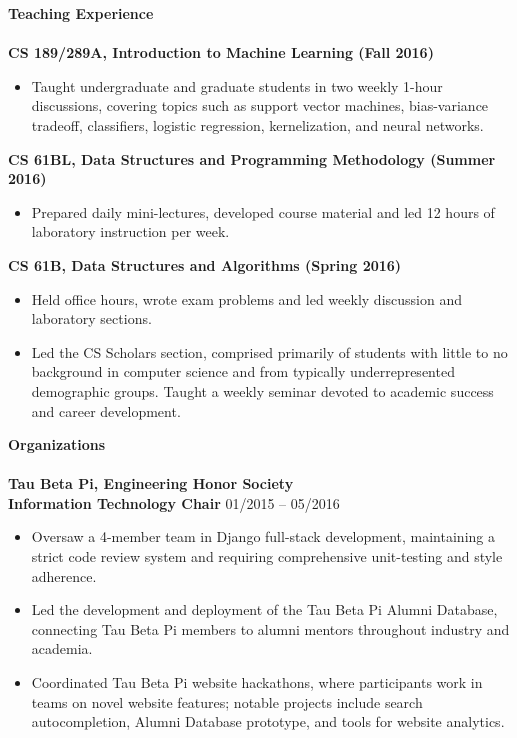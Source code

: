 \documentclass{article}
\begin{document}
\noindent
\textbf{{\Large Teaching Experience}}\\[-2mm]
\HRule\\
\textbf{CS 189/289A, Introduction to Machine Learning (Fall 2016)}
\begin{itemize}
\vspace{-2.5mm}
\item Taught undergraduate and graduate students in two weekly 1-hour discussions, covering topics such as support vector machines, bias-variance tradeoff, classifiers, logistic regression, kernelization, and neural networks.
\end{itemize}
\vspace{-2mm}
\textbf{CS 61BL, Data Structures and Programming Methodology (Summer 2016)}
\begin{itemize}
\vspace{-2.5mm}
\item Prepared daily mini-lectures, developed course material and led 12 hours of laboratory instruction per week.
\end{itemize}
\vspace{-2mm}
\textbf{CS 61B, Data Structures and Algorithms (Spring 2016)}
\begin{itemize}
\vspace{-2.5mm}
\item Held office hours, wrote exam problems and led weekly discussion and laboratory sections.
\vspace{-2.5mm}
\item Led the CS Scholars section, comprised primarily of students with little to no background in computer science and from typically underrepresented demographic groups. Taught a weekly seminar devoted to academic success and career development.
\end{itemize}
\newpage

\noindent
\textbf{{\Large Organizations}}\\[-2mm]
\HRule\\
\textbf{Tau Beta Pi, Engineering Honor Society} \\
\textbf{Information Technology Chair}
\hfill 01/2015 -- 05/2016
\begin{itemize}
\vspace{-2.5mm}
\item Oversaw a 4-member team in Django full-stack development, maintaining a strict code review system and requiring comprehensive unit-testing and style adherence.
\vspace{-2.5mm}
\item Led the development and deployment of the Tau Beta Pi Alumni Database, connecting Tau Beta Pi members to alumni mentors throughout industry and academia.
\vspace{-2.5mm}
\item Coordinated Tau Beta Pi website hackathons, where participants work in teams on novel website features; notable projects include search autocompletion, Alumni Database prototype, and tools for website analytics.
\end{itemize}
\vspace{-3.0mm}
\end{document}
